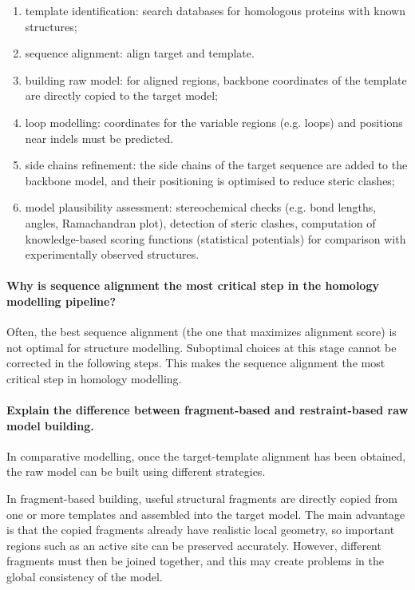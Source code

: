 \begin{enumerate}
\item template identification: search databases for homologous proteins with known
structures;
\item sequence alignment: align target and template. 
\item building raw model: for aligned regions, backbone coordinates of the template are
directly copied to the target model;
\item loop modelling: coordinates for the variable regions (e.g. loops) and positions near
indels must be predicted.
\item side chains refinement: the side chains of the target sequence are added to the
backbone model, and their positioning is optimised to reduce steric clashes;
\item model plausibility assessment: stereochemical checks (e.g. bond lengths, angles,
Ramachandran plot), detection of steric clashes, computation of knowledge-based
scoring functions (statistical potentials) for comparison with experimentally observed
structures.
\end{enumerate}

\paragraph{Why is sequence alignment the most critical step in the homology modelling pipeline?}
Often, the best sequence alignment (the one that maximizes alignment score) is not optimal for structure modelling. Suboptimal choices at this stage cannot be corrected in the following steps. This makes the sequence alignment the most critical step in homology modelling.


\paragraph{Explain the difference between fragment-based and restraint-based raw model building.}
In comparative modelling, once the target-template alignment has been obtained, the raw model can be built using different strategies.

\noindent In fragment-based building, useful structural fragments are directly copied from one or more templates and assembled into the target model. The main advantage is that the copied fragments already have realistic local geometry, so important regions such as an active site can be preserved accurately. However, different fragments must then be joined together, and this may create problems in the global consistency of the model.

